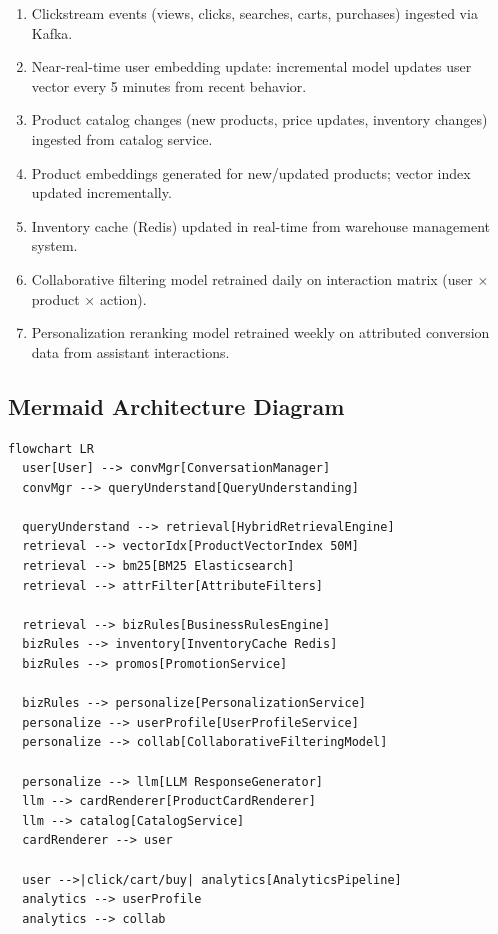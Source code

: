 \begin{enumerate}
  \item Clickstream events (views, clicks, searches, carts, purchases) ingested via Kafka.
  \item Near-real-time user embedding update: incremental model updates user vector every 5 minutes from recent behavior.
  \item Product catalog changes (new products, price updates, inventory changes) ingested from catalog service.
  \item Product embeddings generated for new/updated products; vector index updated incrementally.
  \item Inventory cache (Redis) updated in real-time from warehouse management system.
  \item Collaborative filtering model retrained daily on interaction matrix (user $\times$ product $\times$ action).
  \item Personalization reranking model retrained weekly on attributed conversion data from assistant interactions.
\end{enumerate}

\subsection*{Mermaid Architecture Diagram}

\begin{verbatim}
flowchart LR
  user[User] --> convMgr[ConversationManager]
  convMgr --> queryUnderstand[QueryUnderstanding]

  queryUnderstand --> retrieval[HybridRetrievalEngine]
  retrieval --> vectorIdx[ProductVectorIndex 50M]
  retrieval --> bm25[BM25 Elasticsearch]
  retrieval --> attrFilter[AttributeFilters]

  retrieval --> bizRules[BusinessRulesEngine]
  bizRules --> inventory[InventoryCache Redis]
  bizRules --> promos[PromotionService]

  bizRules --> personalize[PersonalizationService]
  personalize --> userProfile[UserProfileService]
  personalize --> collab[CollaborativeFilteringModel]

  personalize --> llm[LLM ResponseGenerator]
  llm --> cardRenderer[ProductCardRenderer]
  llm --> catalog[CatalogService]
  cardRenderer --> user

  user -->|click/cart/buy| analytics[AnalyticsPipeline]
  analytics --> userProfile
  analytics --> collab
\end{verbatim}

